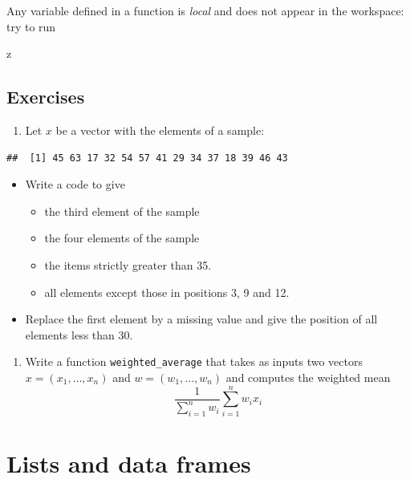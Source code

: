 \documentclass[]{book}
\newenvironment{Shaded}{\begin{snugshade}}{\end{snugshade}}
\newcommand{\NormalTok}[1]{#1}
\providecommand{\tightlist}{%
  \setlength{\itemsep}{0pt}\setlength{\parskip}{0pt}}
\begin{document}
Any variable defined in a function is \emph{local} and does not appear in the workspace: try to run

\begin{Shaded}
\begin{Highlighting}[]
\NormalTok{z}
\end{Highlighting}
\end{Shaded}

\hypertarget{exercises}{%
\section{Exercises}\label{exercises}}

\begin{enumerate}
\def\labelenumi{\arabic{enumi}.}
\tightlist
\item
  Let \(x\) be a vector with the elements of a sample:
\end{enumerate}

\begin{verbatim}
##  [1] 45 63 17 32 54 57 41 29 34 37 18 39 46 43
\end{verbatim}

\begin{itemize}
\tightlist
\item
  Write a code to give

  \begin{itemize}
  \tightlist
  \item
    the third element of the sample
  \item
    the four elements of the sample
  \item
    the items strictly greater than 35.
  \item
    all elements except those in positions 3, 9 and 12.
  \end{itemize}
\item
  Replace the first element by a missing value and give the position of all elements less than 30.
\end{itemize}

\begin{enumerate}
\def\labelenumi{\arabic{enumi}.}
\setcounter{enumi}{1}
\tightlist
\item
  Write a function \texttt{weighted\_average} that takes as inputs two vectors \(x=(x_1,\ldots,x_n)\) and \(w=(w_1,\ldots,w_n)\) and computes the weighted mean
  \[
  \frac{1}{\sum_{i=1}^n w_i}\sum_{i=1}^nw_ix_i
  \]
\end{enumerate}

\hypertarget{lists-and-data-frames}{%
\chapter{Lists and data frames}\label{lists-and-data-frames}}
\end{document}
